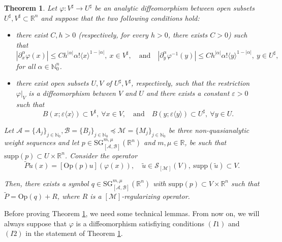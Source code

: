 \documentclass[11pt,reqno]{amsart}
\numberwithin{equation}{section}
\newtheorem{theorem}{Theorem}[section]
\newcommand{\R}{{\mathbb{R}}} %
\newcommand{\caS}{{\mathcal{S}}}
\newcommand{\SG}{{\mathrm{SG}}}
\newcommand{\Mj}{{\{M_j\}_{j\in\mathbb{N}_0}}} %
\newcommand{\Aj}{{\{A_j\}_{j\in\mathbb{N}_0}}} %
\newcommand{\Bj}{{\{B_j\}_{j\in\mathbb{N}_0}}} %
\newcommand{\M}{{\mathcal{M}}} %
\newcommand{\A}{{\mathcal{A}}} %
\newcommand{\B}{{\mathcal{B}}} %
\begin{document}
\begin{theorem}\label{coord_inv}
	Let $\varphi:V^\sharp\to U^\sharp$ be an analytic diffeomorphism between open subsets $U^\sharp,V^\sharp\subset\mathbb{R}^n$ and suppose that the two following conditions hold:
	\begin{itemize}
		\item[$(I1)$] there exist $C,h>0$ (respectively, for every $h>0$, there exists $C>0$) such that
		\begin{equation*}
			|\partial_x^\alpha\varphi(x)|\leq Ch^{|\alpha|}\alpha!\langle x\rangle^{1-|\alpha|},\ x\in V^\sharp,\quad\text{and}\quad |\partial_y^\alpha\varphi^{-1}(y)|\leq Ch^{|\alpha|}\alpha!\langle y\rangle^{1-|\alpha|},\ y\in U^\sharp,
		\end{equation*}
		for all $\alpha\in\mathbb{N}_0^n$.
		
		\item[$(I2)$] there exist open subsets $U,V$ of $U^\sharp,V^\sharp$, respectively, such that 
		the restriction $\varphi|_V$ is a diffeomorphism between $V$ and $U$ and there exists a constant $\varepsilon>0$ such that
		\[B(x;\varepsilon\langle x\rangle)\subset V^\sharp,\ \forall x\in V,\quad\text{and}\quad B(y;\varepsilon\langle y\rangle)\subset U^\sharp,\ \forall y\in U.\]
	\end{itemize}
	
	Let $\A=\Aj,\B=\Bj\preceq\M=\Mj$ be three non-quasianalytic weight sequences and let $p\in {\SG}^{m,\mu}_{[\A,\B]}(\mathbb{R}^n)$ and 
	$m,\mu\in\R$, be such that $\mathrm{supp}(p)\subset U\times\mathbb{R}^n$. Consider the operator
	\begin{equation*}
		\tilde P\tilde u(x) = [\mathrm{Op}(p)u](\varphi(x)),\quad \tilde u\in\caS_{[\M]}(V),\ \mathrm{supp}(\tilde{u})\subset V.
	\end{equation*}
	
	Then, there exists a symbol $q\in {\SG}^{m,\mu}_{[\A,\B]}(\mathbb{R}^n)$ with $\mathrm{supp}(p)\subset V\times\mathbb{R}^n$ such that $\tilde P=\mathrm{Op}(q)+R$, where $R$ is a $[\M]$-regularizing operator.
\end{theorem}

Before proving Theorem \ref{coord_inv}, we need some technical lemmas. From now on, we will always suppose that $\varphi$ is a diffeomorphism
satisfiying conditions $(I1)$ and $(I2)$ in the statement of Theorem \ref{coord_inv}.
\end{document}
